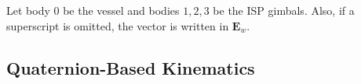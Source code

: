 %
%
%
%
%
%
%
Let body $0$ be the vessel and bodies $1,2,3$ be the ISP gimbals.
%
Also, if a superscript is omitted, the vector is written in $\mathbf{E}_w$.

\subsection{Quaternion-Based Kinematics}

